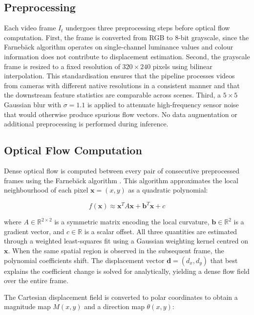 \subsection{Preprocessing}

Each video frame $I_t$ undergoes three preprocessing steps before optical flow computation. First, the frame is converted from RGB to 8-bit grayscale, since the Farneb\"{a}ck algorithm operates on single-channel luminance values and colour information does not contribute to displacement estimation. Second, the grayscale frame is resized to a fixed resolution of $320 \times 240$ pixels using bilinear interpolation. This standardisation ensures that the pipeline processes videos from cameras with different native resolutions in a consistent manner and that the downstream feature statistics are comparable across scenes. Third, a $5 \times 5$ Gaussian blur with $\sigma = 1.1$ is applied to attenuate high-frequency sensor noise that would otherwise produce spurious flow vectors. No data augmentation or additional preprocessing is performed during inference.

\subsection{Optical Flow Computation}

Dense optical flow is computed between every pair of consecutive preprocessed frames using the Farneb\"{a}ck algorithm \cite{farneback2003two}. This algorithm approximates the local neighbourhood of each pixel $\mathbf{x} = (x, y)$ as a quadratic polynomial:

\begin{equation}
  f(\mathbf{x}) \approx \mathbf{x}^T A \mathbf{x} + \mathbf{b}^T \mathbf{x} + c
  \label{eq:polynomial}
\end{equation}

\noindent where $A \in \mathbb{R}^{2 \times 2}$ is a symmetric matrix encoding the local curvature, $\mathbf{b} \in \mathbb{R}^2$ is a gradient vector, and $c \in \mathbb{R}$ is a scalar offset. All three quantities are estimated through a weighted least-squares fit using a Gaussian weighting kernel centred on $\mathbf{x}$. When the same spatial region is observed in the subsequent frame, the polynomial coefficients shift. The displacement vector $\mathbf{d} = (d_x, d_y)$ that best explains the coefficient change is solved for analytically, yielding a dense flow field over the entire frame.

The Cartesian displacement field is converted to polar coordinates to obtain a magnitude map $M(x,y)$ and a direction map $\theta(x,y)$:

